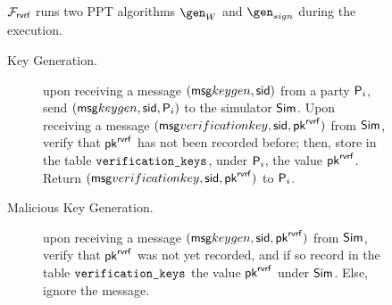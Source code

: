 \begin{figure}\scriptsize
	\begin{tcolorbox}
		{  $ \mathcal{F}_{\textsf{rvrf}} $ runs two PPT algorithms $ \gen_W$ and $\gen_{sign} $ during the execution.
			
			 \begin{description}
				
				\item[Key Generation.] upon receiving a message $(\mathsf{msg}{keygen}, \textsf{sid})$ from a party $\mathsf{P}_i$, send $(\mathsf{msg}{keygen}, \textsf{sid}, \mathsf{P}_i)$ to the simulator $\mathsf{Sim}$.
				Upon receiving a message $(\mathsf{msg}{verificationkey}, \textsf{sid}, \mathsf{pk}^{\mathsf{rvrf}})$ from $\mathsf{Sim}$, verify that $\mathsf{pk}^{\mathsf{rvrf}}$ has not been recorded before; then, store in the table $\texttt{verification\_keys}$, under $\mathsf{P}_i$, the value $\mathsf{pk}^{\mathsf{rvrf}}$.
				Return $(\mathsf{msg}{verificationkey}, \textsf{sid}, \mathsf{pk}^{\mathsf{rvrf}})$ to $ \mathsf{P}_i$.
				
				\item[Malicious Key Generation.] upon receiving a message $(\mathsf{msg}{keygen}, \textsf{sid}, \mathsf{pk}^{\mathsf{rvrf}})$ from $\mathsf{Sim}$, verify that $\mathsf{pk}^{\mathsf{rvrf}}$ was not yet recorded, and if so record in the table $\texttt{verification\_keys}$ the value $\mathsf{pk}^{\mathsf{rvrf}}$ under $\mathsf{Sim}$. Else, ignore the message.
				

\end{description}}
\end{tcolorbox}
\end{figure}
